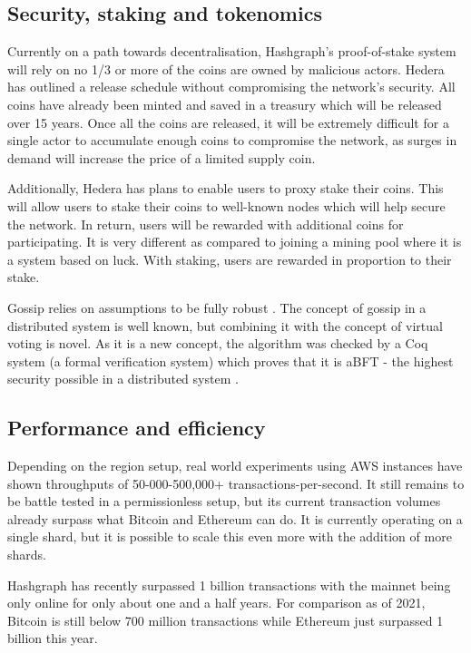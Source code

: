 \subsection{Security, staking and tokenomics}
Currently on a path towards decentralisation, Hashgraph's proof-of-stake system will rely on no 1/3 or more of the coins are owned by malicious actors. Hedera has outlined a release schedule without compromising the network's security. All coins have already been minted and saved in a treasury which will be released over 15 years\cite{economics2020hedera}. Once all the coins are released, it will be extremely difficult for a single actor to accumulate enough coins to compromise the network, as surges in demand will increase the price of a limited supply coin.

Additionally, Hedera has plans to enable users to proxy stake their coins. This will allow users to stake their coins to well-known nodes which will help secure the network\cite{madsen2019hedera}. In return, users will be rewarded with additional coins for participating. It is very different as compared to joining a mining pool where it is a system based on luck. With staking, users are rewarded in proportion to their stake.

Gossip relies on assumptions to be fully robust \cite{alvisi}. The concept of gossip in a distributed system is well known, but combining it with the concept of virtual voting is novel. As it is a new concept, the algorithm was checked by a Coq system (a formal verification system) which proves that it is aBFT - the highest security possible in a distributed system \cite{coq2018}.

\subsection{Performance and efficiency}

Depending on the region setup, real world experiments using AWS instances have shown throughputs of 50-000-500,000+ transactions-per-second\cite{baird2018hedera}. It still remains to be battle tested in a permissionless setup, but its current transaction volumes\cite{hederadashboard} already surpass what Bitcoin and Ethereum can do. It is currently operating on a single shard, but it is possible to scale this even more with the addition of more shards.

Hashgraph has recently surpassed 1 billion transactions with the mainnet being only online for only about one and a half years\cite{kunz2021hedera}. For comparison as of 2021, Bitcoin\cite{btctxn} is still below 700 million transactions while Ethereum\cite{ethtxn} just surpassed 1 billion this year.

